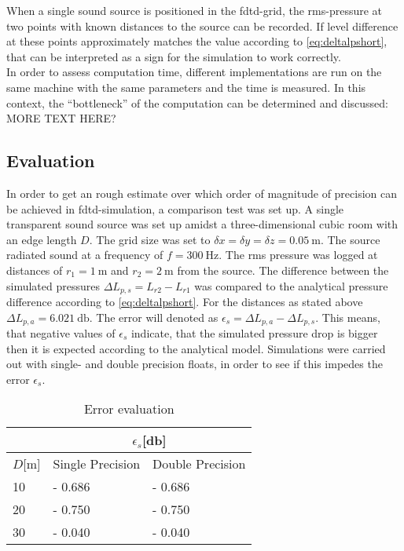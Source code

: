 When a single sound source is positioned in the \gls{fdtd}-grid, the \gls{rms}-pressure at two points with known distances to the source can be recorded. If level difference at these points approximately matches the value according to \autoref{eq:deltalpshort}, that can be interpreted as a sign for the simulation to work correctly.\\
In order to assess computation time, different implementations are run on the same machine with the same parameters and the time is measured. In this context, the ``bottleneck'' of the computation can be determined and discussed: MORE TEXT HERE?
\subsection{Evaluation}\label{ssec:evaluation}
In order to get an rough estimate over which order of magnitude of precision can be achieved in \gls{fdtd}-simulation, a comparison test was set up. A single transparent sound source was set up amidst a three-dimensional cubic room with an edge length $D$. The grid size was set to $\delta x=\delta y=\delta z = \SI{0.05}{\meter}$. The source radiated sound at a frequency of $f=\SI{300}{\hertz}$. The \gls{rms} pressure was logged at distances of $r_1=\SI{1}{\meter}$ and $r_2=\SI{2}{\meter}$ from the source. The difference between the simulated pressures $\Delta L_{p,s}=L_{r2}-L_{r1}$ was compared to the analytical pressure difference according to \autoref{eq:deltalpshort}. For the distances as stated above $\Delta L_{p,a}=\SI{6.021}{\decibel}$. The error will denoted as $\epsilon_{s}=\Delta L_{p,a} - \Delta L_{p,s}$. This means, that negative values of $\epsilon_{s}$ indicate, that the simulated pressure drop is bigger then it is expected according to the analytical model. Simulations were carried out with single- and double precision floats, in order to see if this impedes the error $\epsilon_s$.
\begin{table}[]
\centering
\caption{Error evaluation}
\label{tab:pressure_difference}
\begin{tabular}{l|l|l}
      & \multicolumn{2}{c}{\(\epsilon_s\)[\si{\decibel}]} \\ \hline
\(D\)[\si{\meter}] & Single Precision & Double Precision \\ \hline
10    & - 0.686          & - 0.686          \\ \hline
20    & - 0.750          & - 0.750          \\ \hline
30    & - 0.040          & - 0.040         
\end{tabular}
\end{table} 


